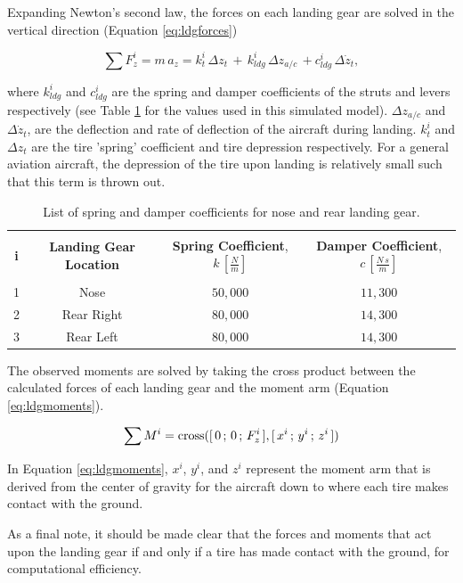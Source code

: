 \documentclass[../chapter_2.tex]{subfiles}
\begin{document}
Expanding Newton's second law, the forces on each landing gear are solved in the vertical direction (Equation \ref{eq:ldgforces})

\begin{equation}
    \sum F^i_z = m\,a_z = k^i_t\, \Delta z_t\, + \, k^i_{ldg}\, \Delta z_{a/c}\, + c^i_{ldg}\, \Delta \dot{z}_t,
    \label{eq:ldgforces}
\end{equation}

where $k^i_{ldg}$ and $c^i_{ldg}$ are the spring and damper coefficients of the struts and levers respectively (see Table \ref{tbl:ldgcoeff} for the values used in this simulated model). $\Delta z_{a/c}$ and $\Delta \dot{z}_t$, are the deflection and rate of deflection of the aircraft during landing. $k^i_t$ and $\Delta z_t$ are the tire 'spring' coefficient and tire depression respectively. For a general aviation aircraft, the depression of the tire upon landing is relatively small such that this term is thrown out.  

\begin{table}[!ht]
    \caption{List of spring and damper coefficients for nose and rear landing gear.}
    \label{tbl:ldgcoeff}
    \centering
\begin{tabular}{|c|c|c|c|}
    \hline
    &&&\\
\textbf{i} & \textbf{Landing Gear Location} & \textbf{Spring Coefficient}, $k\,\left[\frac{N}{m}\right]$ & \textbf{Damper Coefficient}, $c\,\left[\frac{N\,s}{m}\right]$ \\
&&&\\
\hline
1 & Nose                  & $50,000$                & $11,300$               \\
\hline
2 & Rear Right            & $80,000$                & $14,300$               \\
\hline
3 & Rear Left             & $80,000$                & $14,300$               \\
\hline
\end{tabular}
\end{table}

The observed moments are solved by taking the cross product between the calculated forces of each landing gear and the moment arm (Equation \ref{eq:ldgmoments}).

\begin{equation}
    \sum M^i = \textnormal{cross}([\,0\,;\,0\,;\,F^i_z\,],[\,x^i\,;\,y^i\,;\,z^i\,])
    \label{eq:ldgmoments}
\end{equation}

In Equation \ref{eq:ldgmoments}, $x^i$, $y^i$, and $z^i$ represent the moment arm that is derived from the center of gravity for the aircraft down to where each tire makes contact with the ground.

As a final note, it should be made clear that the forces and moments that act upon the landing gear if and only if a tire has made contact with the ground, for computational efficiency.
\end{document}
